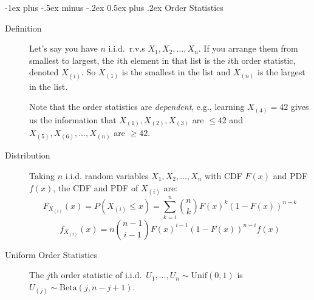 \documentclass[6pt, landscape]{article}
\makeatletter
\renewcommand{\section}{\@startsection{section}{1}{0mm}%
                                {-1ex plus -.5ex minus -.2ex}%
                                {0.5ex plus .2ex}%
                                {\normalfont\bfseries}}
\newcommand{\Beta}{\textrm{Beta}}
\newcommand{\Unif}{\textrm{Unif}}
\makeatother
\begin{document}
\begin{multicols}{3}
        \section{Order Statistics}
        \begin{description}
                \item[Definition] Let's say you have $n$ i.i.d.~r.v.s $X_1, X_2,\dots, X_n$. If you arrange them from smallest to largest, the $i$th element in that list is the $i$th order statistic, denoted $X_{(i)}$. So $X_{(1)}$ is the smallest in the list and $X_{(n)}$ is the largest in the list. \smallskip

                      Note that the order statistics are \emph{dependent}, e.g., learning $X_{(4)} = 42$ gives us the information that $X_{(1)},X_{(2)},X_{(3)}$ are $\leq 42$ and $X_{(5)},X_{(6)},\dots,X_{(n)}$ are $\geq 42$.
                \item[Distribution]  Taking $n$ i.i.d. random variables $X_1, X_2, \dots, X_n$ with CDF $F(x)$ and PDF $f(x)$, the CDF and PDF of $X_{(i)}$ are:
                      \[F_{X_{(i)}}(x) = P (X_{(i)} \leq x) = \sum_{k=i}^n {n \choose k} F(x)^k(1 - F(x))^{n - k}\]
                      \[f_{X_{(i)}}(x) = n{n - 1 \choose i - 1}F(x)^{i-1}(1 - F(x))^{n-i}f(x)\]
                \item[Uniform Order Statistics]  The $j$th order statistic of i.i.d.~$U_1,\dots,U_n \sim \Unif(0,1)$ is $U_{(j)} \sim \Beta(j, n - j + 1)$.
        \end{description}



\end{multicols}
\end{document}
